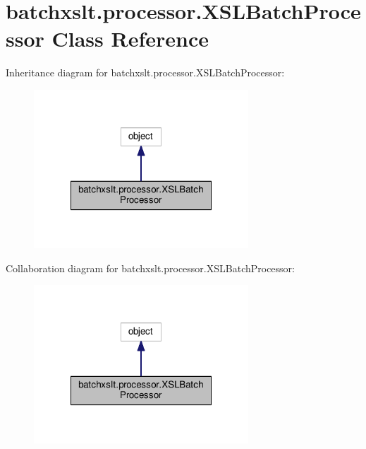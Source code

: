 \hypertarget{classbatchxslt_1_1processor_1_1_x_s_l_batch_processor}{}\section{batchxslt.\+processor.\+X\+S\+L\+Batch\+Processor Class Reference}
\label{classbatchxslt_1_1processor_1_1_x_s_l_batch_processor}


Inheritance diagram for batchxslt.\+processor.\+X\+S\+L\+Batch\+Processor\+:
\nopagebreak
\begin{figure}[H]
\begin{center}
\leavevmode
\includegraphics[width=228pt]{dc/d90/classbatchxslt_1_1processor_1_1_x_s_l_batch_processor__inherit__graph}
\end{center}
\end{figure}


Collaboration diagram for batchxslt.\+processor.\+X\+S\+L\+Batch\+Processor\+:
\nopagebreak
\begin{figure}[H]
\begin{center}
\leavevmode
\includegraphics[width=228pt]{d6/d65/classbatchxslt_1_1processor_1_1_x_s_l_batch_processor__coll__graph}
\end{center}
\end{figure}
